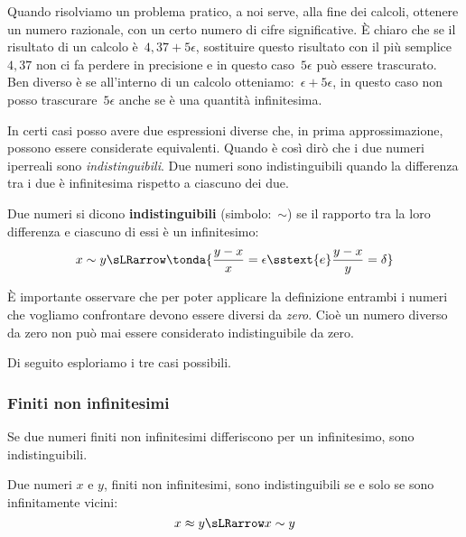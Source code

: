 Quando risolviamo un problema pratico, a noi serve, alla fine dei calcoli, 
ottenere un numero razionale, con un certo numero di cifre significative.
È chiaro che se il risultato di un calcolo è~\(4,37+5\epsilon\), sostituire 
questo risultato con il più semplice~\(4,37\) non ci fa perdere in precisione e 
in questo caso~\(5\epsilon\) può essere trascurato.
Ben diverso è se all'interno di un calcolo  
otteniamo:~\(\epsilon+5\epsilon\), in questo caso non posso 
trascurare~\(5\epsilon\) anche se è una quantità infinitesima. 

In certi casi posso avere due espressioni diverse che, in prima 
approssimazione, possono essere considerate equivalenti. Quando è così dirò 
che i due numeri iperreali sono \emph{indistinguibili}.
Due numeri sono indistinguibili quando la differenza tra i due è 
infinitesima rispetto a ciascuno dei due.

\begin{definizione}
Due numeri si dicono \textbf{indistinguibili} (simbolo:~\(\sim\)) se il 
rapporto tra la loro differenza e ciascuno di essi è un infinitesimo:
\[x \sim y \sLRarrow 
\tonda{\frac{y-x}{x} = \epsilon \sstext{e} \frac{y-x}{y} = \delta}
\]
\end{definizione}

\begin{osservazione}
 È importante osservare che per poter applicare la definizione entrambi i 
numeri che vogliamo confrontare devono essere diversi da \emph{zero}.
Cioè un numero diverso da zero non può mai essere considerato 
indistinguibile da zero.
\end{osservazione}

Di seguito esploriamo i tre casi possibili.

\subsubsection{Finiti non infinitesimi}
\label{subsubsec:insnum_finitini}

Se due numeri finiti non infinitesimi differiscono per un 
infinitesimo, sono indistinguibili.

\begin{teorema}
Due numeri \(x\) e \(y\), finiti non infinitesimi, 
sono indistinguibili se e solo se sono infinitamente vicini:
\[x \approx y \sLRarrow x \sim y\]
\end{teorema}


